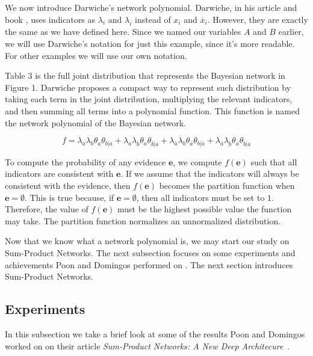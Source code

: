 \documentclass[a4paper,10pt]{article}
\theoremstyle{plain}
\begin{document}
We now introduce Darwiche's network polynomial. Darwiche, in his article and book
\cite{diff-approach-darwiche,bayes-net-darwiche}, uses indicators as $\lambda_i$ and
$\lambda_{\overline{i}}$ instead of $x_i$ and $\overline{x}_i$. However, they are exactly the same
as we have defined here. Since we named our variables $A$ and $B$ earlier, we will use Darwiche's
notation for just this example, since it's more readable. For other examples we will use our own
notation.

Table 3 is the full joint distribution that represents the Bayesian network in Figure 1. Darwiche
proposes a compact way to represent such distribution by taking each term in the joint
distribution, multiplying the relevant indicators, and then summing all terms into a polynomial
function. This function is named the network polynomial of the Bayesian network.

\begin{equation}
  f = \lambda_a\lambda_b\theta_a\theta_{b|a} +
      \lambda_a\lambda_{\overline{b}}\theta_a\theta_{\overline{b}|a} +
      \lambda_{\overline{a}}\lambda_b\theta_{\overline{a}}\theta_{b|\overline{a}} +
      \lambda_{\overline{a}}\lambda_{\overline{b}}\theta_{\overline{a}}\theta_{\overline{b}|\overline{a}}
\end{equation}

To compute the probability of any evidence $\mathbf{e}$, we compute $f(\mathbf{e})$ such that all
indicators are consistent with $\mathbf{e}$. If we assume that the indicators will always be
consistent with the evidence, then $f(\mathbf{e})$ becomes the partition function when
$\mathbf{e}=\emptyset$. This is true because, if $\mathbf{e}=\emptyset$, then all indicators must
be set to $1$. Therefore, the value of $f(\mathbf{e})$ must be the highest possible value the
function may take. The partition function normalizes an unnormalized distribution.

Now that we know what a network polynomial is, we may start our study on Sum-Product Networks.
The next subsection focuses on some experiments and achievements Poon and Domingos performed on
\cite{poon-domingos}. The next section introduces Sum-Product Networks.

\subsection{Experiments}

In this subsection we take a brief look at some of the results Poon and Domingos worked on on their
article \textit{Sum-Product Networks: A New Deep Architecure}~\cite{poon-domingos}.
\end{document}
